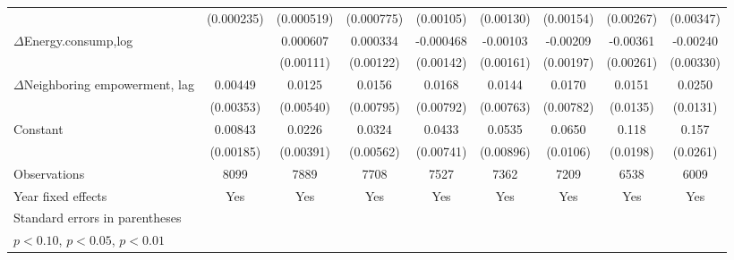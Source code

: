 \begin{table}[htbp]
\begin{tabular}{l*{8}{c}}
                    &  (0.000235)         &  (0.000519)         &  (0.000775)         &   (0.00105)         &   (0.00130)         &   (0.00154)         &   (0.00267)         &   (0.00347)         \\
[1em]
$\Delta$Energy.consump,log             &                     &    0.000607         &    0.000334         &   -0.000468         &    -0.00103         &    -0.00209         &    -0.00361         &    -0.00240         \\
                    &                     &   (0.00111)         &   (0.00122)         &   (0.00142)         &   (0.00161)         &   (0.00197)         &   (0.00261)         &   (0.00330)         \\
[1em]
$\Delta$Neighboring empowerment, lag&     0.00449         &      0.0125\sym{**} &      0.0156\sym{*}  &      0.0168\sym{**} &      0.0144\sym{*}  &      0.0170\sym{**} &      0.0151         &      0.0250\sym{*}  \\
                    &   (0.00353)         &   (0.00540)         &   (0.00795)         &   (0.00792)         &   (0.00763)         &   (0.00782)         &    (0.0135)         &    (0.0131)         \\
[1em]
Constant            &     0.00843\sym{***}&      0.0226\sym{***}&      0.0324\sym{***}&      0.0433\sym{***}&      0.0535\sym{***}&      0.0650\sym{***}&       0.118\sym{***}&       0.157\sym{***}\\
                    &   (0.00185)         &   (0.00391)         &   (0.00562)         &   (0.00741)         &   (0.00896)         &    (0.0106)         &    (0.0198)         &    (0.0261)         \\
\hline
Observations        &        8099         &        7889         &        7708         &        7527         &        7362         &        7209         &        6538         &        6009         \\
Year fixed effects           &           Yes        &     Yes          &    Yes          &   Yes         &     Yes          &     Yes           &    Yes          &    Yes         \\
\hline\hline
\multicolumn{9}{l}{\footnotesize Standard errors in parentheses}\\
\multicolumn{9}{l}{\footnotesize \sym{*} \(p<0.10\), \sym{**} \(p<0.05\), \sym{***} \(p<0.01\)}\\
\end{tabular}
\end{table}
